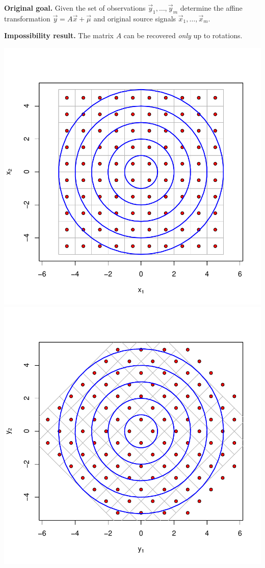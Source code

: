 \documentclass[landscape,footrule]{foils}
\begin{document}
\titlefoil





\textbf{Original goal.} 
Given the set of observations $\vec{y}_1,\ldots, \vec{y}_m$ determine the affine transformation $\vec{y}=A\vec{x}+\vec{\mu}$ and original source signals  $\vec{x}_1,\ldots, \vec{x}_m$.


\textbf{Impossibility result.}
The matrix $A$ can be recovered \emph{only} up to rotations.


\begin{center}
\includegraphics[scale=0.55]{original-contours.pdf}
\includegraphics[scale=0.55]{rotated-contours.pdf}

\end{center}
\end{document}
